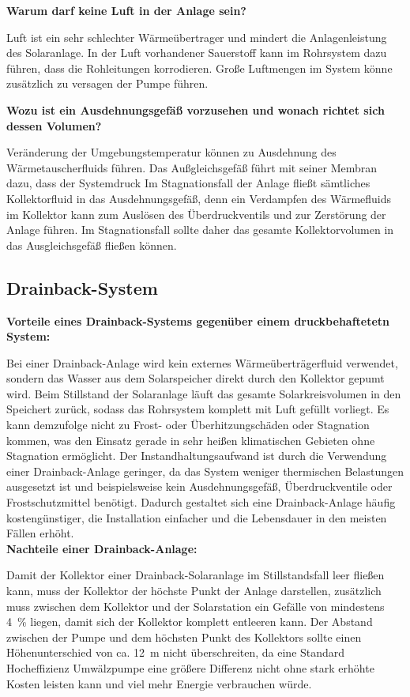 \textbf{Warum darf keine Luft in der Anlage sein?}

Luft ist ein sehr schlechter Wärmeübertrager und mindert die Anlagenleistung des Solaranlage. In der Luft vorhandener Sauerstoff kann im Rohrsystem dazu führen, dass die Rohleitungen korrodieren. Große Luftmengen im System könne zusätzlich zu versagen der Pumpe führen. 

\textbf{Wozu ist ein Ausdehnungsgefäß vorzusehen und wonach richtet sich dessen Volumen?}

Veränderung der Umgebungstemperatur können zu Ausdehnung des Wärmetauscherfluids führen. Das Außgleichsgefäß führt mit seiner Membran dazu, dass der Systemdruck Im Stagnationsfall der Anlage fließt sämtliches Kollektorfluid in das Ausdehnungsgefäß, denn ein Verdampfen des Wärmefluids im Kollektor kann zum Auslösen des Überdruckventils und zur Zerstörung der Anlage führen. Im Stagnationsfall sollte daher das gesamte Kollektorvolumen in das Ausgleichsgefäß fließen können.

\subsection{Drainback-System}

\textbf{Vorteile eines Drainback-Systems gegenüber einem druckbehaftetetn System:}

Bei einer Drainback-Anlage wird kein externes Wärmeüberträgerfluid verwendet, sondern das Wasser aus dem Solarspeicher direkt durch den Kollektor gepumt wird. Beim Stillstand der Solaranlage läuft das gesamte Solarkreisvolumen in den Speichert zurück, sodass das Rohrsystem  komplett mit Luft gefüllt vorliegt. Es kann demzufolge nicht zu Frost- oder Überhitzungschäden oder Stagnation kommen, was den Einsatz gerade in sehr heißen klimatischen Gebieten ohne Stagnation ermöglicht. Der Instandhaltungsaufwand ist durch die Verwendung einer Drainback-Anlage geringer, da das System weniger thermischen Belastungen ausgesetzt ist und beispielsweise kein Ausdehnungsgefäß, Überdruckventile oder Frostschutzmittel benötigt. Dadurch gestaltet sich eine Drainback-Anlage häufig kostengünstiger, die Installation einfacher und die Lebensdauer in den meisten Fällen erhöht. \\

\textbf{Nachteile einer Drainback-Anlage:}

Damit der Kollektor einer Drainback-Solaranlage im Stillstandsfall leer fließen kann, muss der Kollektor der höchste Punkt der Anlage darstellen, zusätzlich muss zwischen dem Kollektor und der Solarstation ein Gefälle von mindestens \SI{4}{\percent} liegen, damit sich der Kollektor komplett entleeren kann. 
Der Abstand zwischen der Pumpe und dem höchsten Punkt des Kollektors sollte einen Höhenunterschied von ca. \SI{12}{\meter} nicht überschreiten, da eine Standard Hocheffizienz Umwälzpumpe eine größere Differenz nicht ohne stark erhöhte Kosten leisten kann und viel mehr Energie verbrauchen würde. \\

